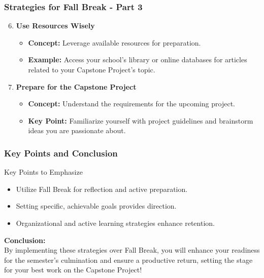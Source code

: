\documentclass[aspectratio=169]{beamer}
\begin{document}
\begin{frame}[fragile]
    \frametitle{Strategies for Fall Break - Part 3}
    \begin{enumerate}
        \setcounter{enumi}{5}
        \item \textbf{Use Resources Wisely}
            \begin{itemize}
                \item \textbf{Concept:} Leverage available resources for preparation.
                \item \textbf{Example:} Access your school’s library or online databases for articles related to your Capstone Project's topic.
            \end{itemize}

        \item \textbf{Prepare for the Capstone Project}
            \begin{itemize}
                \item \textbf{Concept:} Understand the requirements for the upcoming project.
                \item \textbf{Key Point:} Familiarize yourself with project guidelines and brainstorm ideas you are passionate about.
            \end{itemize}
    \end{enumerate}
\end{frame}

\begin{frame}[fragile]
    \frametitle{Key Points and Conclusion}
    \begin{block}{Key Points to Emphasize}
        \begin{itemize}
            \item Utilize Fall Break for reflection and active preparation.
            \item Setting specific, achievable goals provides direction.
            \item Organizational and active learning strategies enhance retention.
        \end{itemize}
    \end{block}

    \textbf{Conclusion:} \\
    By implementing these strategies over Fall Break, you will enhance your readiness for the semester’s culmination and ensure a productive return, setting the stage for your best work on the Capstone Project!
\end{frame}
\end{document}
